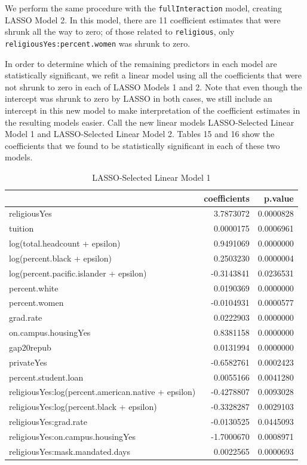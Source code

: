 \documentclass[
]{article}
\begin{document}
We perform the same procedure with the \texttt{fullInteraction} model,
creating LASSO Model 2. In this model, there are 11 coefficient
estimates that were shrunk all the way to zero; of those related to
\texttt{religious}, only \texttt{religiousYes:percent.women} was shrunk
to zero.

In order to determine which of the remaining predictors in each model
are statistically significant, we refit a linear model using all the
coefficients that were not shrunk to zero in each of LASSO Models 1 and
2. Note that even though the intercept was shrunk to zero by LASSO in
both cases, we still include an intercept in this new model to make
interpretation of the coefficient estimates in the resulting models
easier. Call the new linear models LASSO-Selected Linear Model 1 and
LASSO-Selected Linear Model 2. Tables 15 and 16 show the coefficients
that we found to be statistically significant in each of these two
models.

\begin{table}

\caption{\label{tab:unnamed-chunk-32}LASSO-Selected Linear Model 1}
\centering
\begin{tabular}[t]{l|r|r}
\hline
  & coefficients & p.value\\
\hline
religiousYes & 3.7873072 & 0.0000828\\
\hline
tuition & 0.0000175 & 0.0006961\\
\hline
log(total.headcount + epsilon) & 0.9491069 & 0.0000000\\
\hline
log(percent.black + epsilon) & 0.2503230 & 0.0000004\\
\hline
log(percent.pacific.islander + epsilon) & -0.3143841 & 0.0236531\\
\hline
percent.white & 0.0190369 & 0.0000000\\
\hline
percent.women & -0.0104931 & 0.0000577\\
\hline
grad.rate & 0.0222903 & 0.0000000\\
\hline
on.campus.housingYes & 0.8381158 & 0.0000000\\
\hline
gap20repub & 0.0131994 & 0.0000000\\
\hline
privateYes & -0.6582761 & 0.0002423\\
\hline
percent.student.loan & 0.0055166 & 0.0041280\\
\hline
religiousYes:log(percent.american.native + epsilon) & -0.4278807 & 0.0093028\\
\hline
religiousYes:log(percent.black + epsilon) & -0.3328287 & 0.0029103\\
\hline
religiousYes:grad.rate & -0.0130525 & 0.0445093\\
\hline
religiousYes:on.campus.housingYes & -1.7000670 & 0.0008971\\
\hline
religiousYes:mask.mandated.days & 0.0022565 & 0.0000693\\
\hline
\end{tabular}
\end{table}
\end{document}

